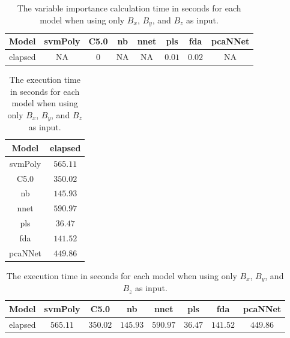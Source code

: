 \begin{table}[!ht]
	\centering
	\begin{tabular}{|c|c|c|c|c|c|c|c|}
		\hline
		Model & svmPoly & C5.0 & nb & nnet & pls & fda & pcaNNet \\ \hline
		elapsed & NA & $0$ & NA & NA & $0.01$ & $0.02$ & NA \\ \hline
	\end{tabular}
	\caption{The variable importance calculation time in seconds for each model when using only $B_{x}$, $B_{y}$, and $B_{z}$ as input.}
	\label{tab:time:reverse:coord:importance}
\end{table}

\begin{table}[!ht]
	\centering
	\begin{tabular}{|c|c|}
		\hline
		Model & elapsed \\ \hline
		svmPoly & $565.11$ \\ \hline
		C5.0 & $350.02$ \\ \hline
		nb & $145.93$ \\ \hline
		nnet & $590.97$ \\ \hline
		pls & $36.47$ \\ \hline
		fda & $141.52$ \\ \hline
		pcaNNet & $449.86$ \\ \hline
	\end{tabular}
	\caption{The execution time in seconds for each model when using only $B_{x}$, $B_{y}$, and $B_{z}$ as input.}
	\label{tab:time:coord:total}
\end{table}

\begin{table}[!ht]
	\centering
	\begin{tabular}{|c|c|c|c|c|c|c|c|}
		\hline
		Model & svmPoly & C5.0 & nb & nnet & pls & fda & pcaNNet \\ \hline
		elapsed & $565.11$ & $350.02$ & $145.93$ & $590.97$ & $36.47$ & $141.52$ & $449.86$ \\ \hline
	\end{tabular}
	\caption{The execution time in seconds for each model when using only $B_{x}$, $B_{y}$, and $B_{z}$ as input.}
	\label{tab:time:reverse:coord:total}
\end{table}

